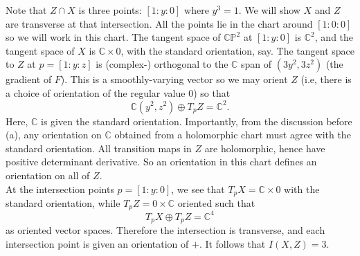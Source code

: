 \documentclass{amsbook}
\theoremstyle{theorem}
\theoremstyle{plain}
\theoremstyle{remark}
\newcommand{\C}{\mathbb C}
\renewcommand{\P}{\mathbb P}
\begin{document}
Note that $Z\cap X$ is three points: $[1:y:0]$ where $y^3 = 1$. We will show $X$ and $Z$ are transverse at that intersection. All the points lie in the chart around $[1:0:0]$ so we will work in this chart. The tangent space of $\C\P^2$ at $[1:y:0]$ is $\C^2$, and the tangent space of $X$ is $\C \times 0$, with the standard orientation, say. The tangent space to $Z$ at $p = [1:y:z]$ is (complex-) orthogonal to the $\C$ span of $(3y^2, 3z^2)$ (the gradient of $F$). This is a smoothly-varying vector so we may orient $Z$ (i.e, there is a choice of orientation of the regular value $0$) so that \[\C(y^2, z^2) \oplus T_pZ = \C^2.\] Here, $\C$ is given the standard orientation. Importantly, from the discussion before (a), any orientation on $\C$ obtained from a holomorphic chart must agree with the standard orientation. All transition maps in $Z$ are holomorphic, hence have positive determinant derivative. So an orientation in this chart defines an orientation on all of $Z$. \\

At the intersection points $p=[1:y:0]$, we see that $T_pX = \C \times 0$ with the standard orientation, while $T_pZ = 0\times \C$ oriented such that \[T_pX\oplus T_pZ = \C^4\] as oriented vector spaces. Therefore the intersection is transverse, and each intersection point is given an orientation of $+$. It follows that $I(X,Z) = 3$.



% 
% 

\end{document}
